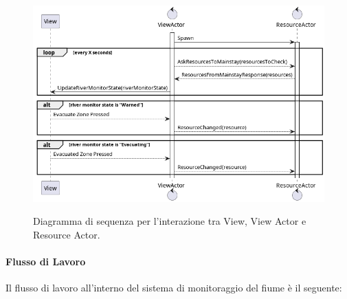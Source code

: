 \documentclass[12pt]{article}
\begin{document}
\begin{figure}[H]
    \caption{Diagramma di sequenza per l'interazione tra View, View Actor e Resource Actor.}
    \includegraphics[width=\textwidth]{../assets/images/view-interaction-diagram.png}
    \label{fig:view-interaction-diagram}
\end{figure}

\paragraph{Flusso di Lavoro}

Il flusso di lavoro all'interno del sistema di monitoraggio del fiume è il seguente:
\end{document}
